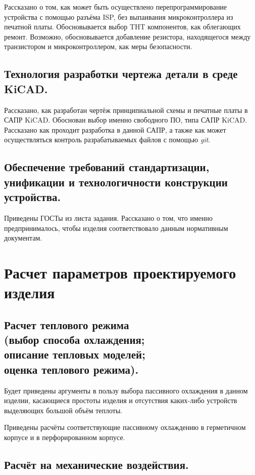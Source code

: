 \documentclass[a4paper]{bsuir-std}
\begin{document}
Рассказано о том, как  может быть осуществлено перепрограммирование устройства с
помощью разъёма ISP, без выпаивания микроконтроллера из печатной
платы. Обосновывается выбор THT компонентов, как облегающих ремонт.
Возможно, обосновывается добавление резистора, находящегося
между транзистором и микроконтроллером, как меры безопасности.

\subsection{Технология разработки чертежа детали в среде KiCAD.}

Рассказано, как разработан чертёж принципиальной схемы и печатные
платы в САПР KiCAD. Обоснован выбор именно свободного ПО, типа САПР
KiCAD.  Рассказано как проходит разработка в данной САПР, а также как
может осуществляться контроль разрабатываемых файлов с помощью \textit{git}.

\subsection{Обеспечение требований стандартизации, \\
  унификации и технологичности конструкции устройства.}

Приведены ГОСТы из листа задания. Рассказано о том, что именно
предпринималось, чтобы изделия соответствовало данным нормативным
документам.

\section{Расчет параметров проектируемого изделия}

\subsection{Расчет теплового режима \\
  (выбор способа охлаждения; \\
  описание тепловых моделей; \\
  оценка теплового режима). }

Будет приведены аргументы в пользу выбора пассивного охлаждения в
данном изделии, касающиеся простоты изделия и отсутствия каких-либо
устройств выделяющих большой объём теплоты.

Приведены расчёты соответствующие пассивному охлаждению в герметичном
корпусе и в перфорированном корпусе.

\subsection{Расчёт на механические воздействия. }
\end{document}
